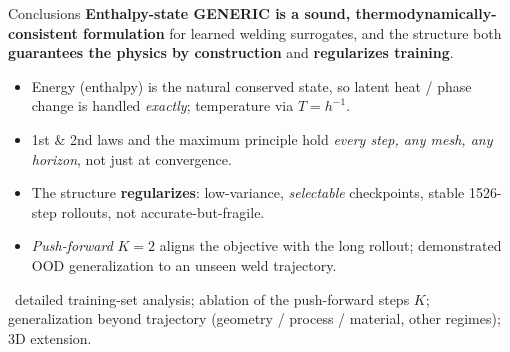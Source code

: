 \documentclass[aspectratio=169,11pt]{beamer}
\begin{document}
\begin{frame}{Conclusions}
  \textbf{Enthalpy-state GENERIC is a sound, thermodynamically-consistent
  formulation} for learned welding surrogates, and the structure both
  \textbf{guarantees the physics by construction} and \textbf{regularizes
  training}.
  \smallskip\pause

  \begin{itemize}[<+->]\itemsep2pt
    \item Energy (enthalpy) is the natural conserved state, so latent
      heat / phase change is handled \emph{exactly}; temperature via $T=h^{-1}$.
    \item 1st \& 2nd laws and the maximum principle hold \emph{every step, any
      mesh, any horizon}, not just at convergence.
    \item The structure \textbf{regularizes}: low-variance, \emph{selectable}
      checkpoints, stable \num{1526}-step rollouts, not accurate-but-fragile.
    \item \emph{Push-forward} $K{=}2$ aligns the objective with the long
      rollout; demonstrated OOD generalization to an unseen weld trajectory.
  \end{itemize}
  \smallskip\pause

  {\ \small detailed training-set analysis;
  ablation of the push-forward steps $K$; generalization beyond trajectory
  (geometry / process / material, other regimes); 3D extension.}
  \smallskip\pause
  \begin{center}\end{center}
\end{frame}
\end{document}
